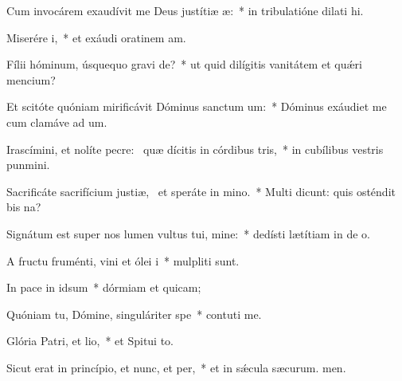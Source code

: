 \item Cum invocárem exaudívit me Deus justítiæ æ:~* in tribulatióne dilati hi.
\item Miserére i,~* et exáudi oratinem am.
\item Fílii hóminum, úsquequo gravi de?~* ut quid dilígitis vanitátem et quǽri mencium?
\item Et scitóte quóniam mirificávit Dóminus sanctum um:~* Dóminus exáudiet me cum clamáve ad um.
\item Irascímini, et nolíte pecre:~\pscross{} quæ dícitis in córdibus tris,~* in cubílibus vestris punmini.
\item Sacrificáte sacrifícium justiæ,~\pscross{} et speráte in mino.~* Multi dicunt: quis osténdit bis na?
\item Signátum est super nos lumen vultus tui, mine:~* dedísti lætítiam in de o.
\item A fructu fruménti, vini et ólei i~* mulpliti sunt.
\item In pace in idsum~* dórmiam et quicam;
\item Quóniam tu, Dómine, singuláriter  spe~* contuti me.
\item Glória Patri, et lio,~* et Spitui to.
\item Sicut erat in princípio, et nunc, et per,~* et in sǽcula sæcurum. men.
